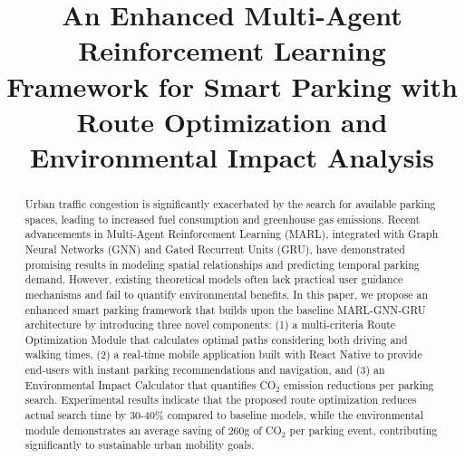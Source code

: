 \documentclass[conference]{IEEEtran}
\begin{document}
\title{An Enhanced Multi-Agent Reinforcement Learning Framework for Smart Parking with Route Optimization and Environmental Impact Analysis\\
}

\author{
\and
{}
}

\maketitle

\begin{abstract}
Urban traffic congestion is significantly exacerbated by the search for available parking spaces, leading to increased fuel consumption and greenhouse gas emissions. Recent advancements in Multi-Agent Reinforcement Learning (MARL), integrated with Graph Neural Networks (GNN) and Gated Recurrent Units (GRU), have demonstrated promising results in modeling spatial relationships and predicting temporal parking demand. However, existing theoretical models often lack practical user guidance mechanisms and fail to quantify environmental benefits. In this paper, we propose an enhanced smart parking framework that builds upon the baseline MARL-GNN-GRU architecture by introducing three novel components: (1) a multi-criteria Route Optimization Module that calculates optimal paths considering both driving and walking times, (2) a real-time mobile application built with React Native to provide end-users with instant parking recommendations and navigation, and (3) an Environmental Impact Calculator that quantifies CO$_2$ emission reductions per parking search. Experimental results indicate that the proposed route optimization reduces actual search time by 30-40\% compared to baseline models, while the environmental module demonstrates an average saving of 260g of CO$_2$ per parking event, contributing significantly to sustainable urban mobility goals.
\end{abstract}
\end{document}
